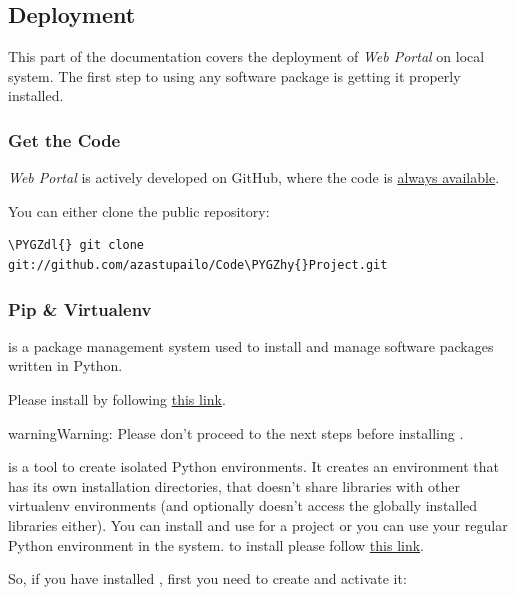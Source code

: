 \documentclass[letterpaper,10pt,english]{sphinxmanual}
\def\PYGZdl{\char`\$}
\def\PYGZhy{\char`\-}
\begin{document}
\subsection{Deployment}
\label{web_portal:deployment}
This part of the documentation covers the deployment of \emph{Web Portal} on local
system. The first step to using any software package is getting it properly
installed.


\subsubsection{Get the Code}
\label{web_portal:get-the-code}
\emph{Web Portal} is actively developed on GitHub, where the code is
\href{https://github.com/azastupailo/Code-Project}{always available}.

You can either clone the public repository:

\begin{Verbatim}[commandchars=\\\{\}]
\PYGZdl{} git clone git://github.com/azastupailo/Code\PYGZhy{}Project.git
\end{Verbatim}


\subsubsection{Pip \& Virtualenv}
\label{web_portal:pip-virtualenv}
 is a package management system used to install and manage software
packages written in Python.

Please install  by following
\href{https://pip.pypa.io/en/latest/installing.html}{this link}.

\begin{notice}{warning}{Warning:}
Please don't proceed to the next steps before installing .
\end{notice}

 is a tool to create isolated Python environments. It creates
an environment that has its own installation directories, that doesn't share
libraries with other virtualenv environments (and optionally doesn't access
the globally installed libraries either).
You can install  and use for a project or you can use
your regular Python environment in the system. to install 
please follow \href{https://virtualenv.pypa.io/en/latest/installation.html}{this link}.

So, if you have installed , first you need to create and
activate it:
\end{document}
